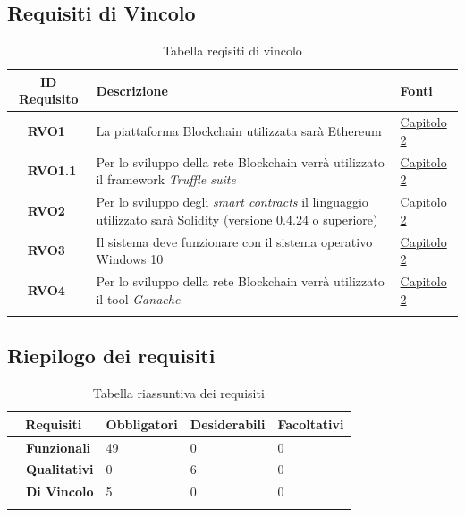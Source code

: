 \subsection{Requisiti di Vincolo}
\begin{longtable}{|r l|p{10cm}|p{2cm}|}
	\hline
	\multicolumn{2}{|c|}{\textbf{ID Requisito}} & \textbf{Descrizione} & \textbf{Fonti}\tabularnewline
	\hline
	&\textbf{RVO1}& La piattaforma Blockchain utilizzata sarà Ethereum & \hyperref[cap:tecnologie_e_strumenti]{Capitolo 2}\\\hline
	&\textbf{RVO1.1}& Per lo sviluppo della rete Blockchain verrà utilizzato il \gls{framework} \textit{Truffle suite} & \hyperref[cap:tecnologie_e_strumenti]{Capitolo 2}\\\hline
	&\textbf{RVO2}& Per lo sviluppo degli \textit{smart contracts} il linguaggio utilizzato sarà Solidity (versione 0.4.24 o superiore) & \hyperref[cap:tecnologie_e_strumenti]{Capitolo 2}\\\hline
	&\textbf{RVO3}& Il sistema deve funzionare con il sistema operativo Windows 10 & \hyperref[cap:tecnologie_e_strumenti]{Capitolo 2}\\\hline
	&\textbf{RVO4}& Per lo sviluppo della rete Blockchain verrà utilizzato il tool \textit{Ganache} & \hyperref[cap:tecnologie_e_strumenti]{Capitolo 2}\\\hline
	\caption{Tabella reqisiti di vincolo}
\end{longtable}
\subsection{Riepilogo dei requisiti}
\begin{longtable}{|r l|p{2cm}|p{2cm}|p{2cm}|}
		\hline
		\multicolumn{2}{|c|}{\textbf{Requisiti}} & \textbf{Obbligatori} & \textbf{Desiderabili} & \textbf{Facoltativi} \tabularnewline
		\hline
		&\textbf{Funzionali}&49&0&0\\\hline
		&\textbf{Qualitativi}&0&6&0\\\hline
		&\textbf{Di Vincolo}&5&0&0\\\hline
		\caption{Tabella riassuntiva dei requisiti}
	\end{longtable}